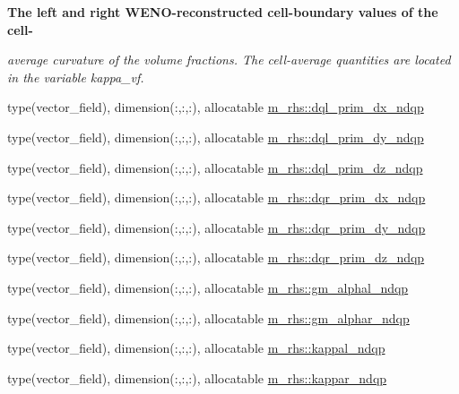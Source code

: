 \begin{Indent}\textbf{ The left and right W\+E\+N\+O-\/reconstructed cell-\/boundary values of the cell-\/}\par
{\em average curvature of the volume fractions. The cell-\/average quantities are located in the variable kappa\+\_\+vf. }\begin{DoxyCompactItemize}
\item 
type(vector\+\_\+field), dimension(\+:,\+:,\+:), allocatable \hyperlink{namespacem__rhs_af321ac08aa0b1f2b444dc81d922445be}{m\+\_\+rhs\+::dql\+\_\+prim\+\_\+dx\+\_\+ndqp}
\item 
type(vector\+\_\+field), dimension(\+:,\+:,\+:), allocatable \hyperlink{namespacem__rhs_abd2dcf26ba04cbfac917774656aef38b}{m\+\_\+rhs\+::dql\+\_\+prim\+\_\+dy\+\_\+ndqp}
\item 
type(vector\+\_\+field), dimension(\+:,\+:,\+:), allocatable \hyperlink{namespacem__rhs_a4fdfac6ef18dff54b9f466f8cfb12c50}{m\+\_\+rhs\+::dql\+\_\+prim\+\_\+dz\+\_\+ndqp}
\item 
type(vector\+\_\+field), dimension(\+:,\+:,\+:), allocatable \hyperlink{namespacem__rhs_a190b9d019243f3504246e0e621e4bc66}{m\+\_\+rhs\+::dqr\+\_\+prim\+\_\+dx\+\_\+ndqp}
\item 
type(vector\+\_\+field), dimension(\+:,\+:,\+:), allocatable \hyperlink{namespacem__rhs_a40f05825c656c34602ba19e320537359}{m\+\_\+rhs\+::dqr\+\_\+prim\+\_\+dy\+\_\+ndqp}
\item 
type(vector\+\_\+field), dimension(\+:,\+:,\+:), allocatable \hyperlink{namespacem__rhs_a9cf1c914824cb4cc3476416da9be78f4}{m\+\_\+rhs\+::dqr\+\_\+prim\+\_\+dz\+\_\+ndqp}
\item 
type(vector\+\_\+field), dimension(\+:,\+:,\+:), allocatable \hyperlink{namespacem__rhs_a5886ad6e79bba7c4cf7fa1475aac824a}{m\+\_\+rhs\+::gm\+\_\+alphal\+\_\+ndqp}
\item 
type(vector\+\_\+field), dimension(\+:,\+:,\+:), allocatable \hyperlink{namespacem__rhs_a871a36bf12852bfc85560beba25cbfb9}{m\+\_\+rhs\+::gm\+\_\+alphar\+\_\+ndqp}
\item 
type(vector\+\_\+field), dimension(\+:,\+:,\+:), allocatable \hyperlink{namespacem__rhs_a52c1749bb933147f34129949411d72cd}{m\+\_\+rhs\+::kappal\+\_\+ndqp}
\item 
type(vector\+\_\+field), dimension(\+:,\+:,\+:), allocatable \hyperlink{namespacem__rhs_a5114054db70e67aaf7b2c8e71d63c934}{m\+\_\+rhs\+::kappar\+\_\+ndqp}
\end{DoxyCompactItemize}
\end{Indent}

